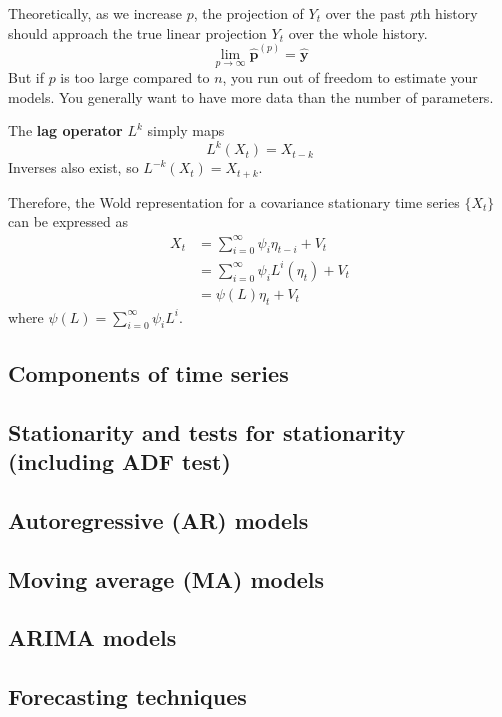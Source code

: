 \documentclass{article}
\begin{document}
  Theoretically, as we increase $p$, the projection of $Y_t$ over the past $p$th history should approach the true linear projection $Y_t$ over the whole history. 
  \begin{equation}
    \lim_{p \rightarrow \infty} \hat{\mathbf{p}}^{(p)} = \hat{\mathbf{y}}
  \end{equation}
  But if $p$ is too large compared to $n$, you run out of freedom to estimate your models. You generally want to have more data than the number of parameters. 

  \begin{definition}
    The \textbf{lag operator} $L^k$ simply maps 
    \begin{equation}
      L^k (X_t)= X_{t-k}
    \end{equation}
    Inverses also exist, so $L^{-k} (X_t) = X_{t+k}$. 
  \end{definition}

  Therefore, the Wold representation for a covariance stationary time series $\{X_t\}$ can be expressed as 
  \begin{align}
    X_t & = \sum_{i=0}^\infty \psi_i \eta_{t-i} + V_t \\
        & = \sum_{i=0}^\infty \psi_i L^i (\eta_{t}) + V_t \\
        & = \psi(L) \eta_t + V_t 
  \end{align}
  where $\psi(L) = \sum_{i=0}^\infty \psi_i L^i$. 

\subsection{Components of time series}

\subsection{Stationarity and tests for stationarity (including ADF test)}

\subsection{Autoregressive (AR) models}

\subsection{Moving average (MA) models}

\subsection{ARIMA models}

\subsection{Forecasting techniques}




\end{document}
